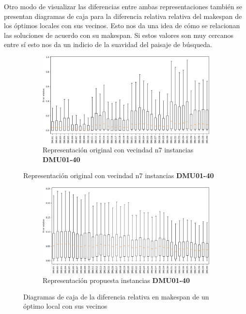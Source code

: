 Otro modo de visualizar las diferencias entre ambas representaciones también se presentan diagramas de caja para la diferencia relativa relativa del makespan de los óptimos locales con sus vecinos. Esto nos da una idea de cómo se relacionan las soluciones de acuerdo con su makespan. Si estos valores son muy cercanos entre sí esto nos da un indicio de la suavidad del paisaje de búsqueda.
\begin{figure}[H]
    \begin{subfigure}{\textwidth}
        \centering
        \includegraphics[scale=.6]{Imagenes/bxpn7_1.png}
        \caption{Representación original con vecindad n7 instancias \textbf{DMU01-40}}
    \end{subfigure}
\end{figure}
\begin{figure}[H]\ContinuedFloat
    \begin{subfigure}{\textwidth}
        \centering
        \includegraphics[scale=.6]{Imagenes/bxppr_1.png}
        \caption{Representación propuesta instancias \textbf{DMU01-40}}
    \end{subfigure}
    \caption{Diagramas de caja de la diferencia relativa en makespan de un óptimo local con sus vecinos}
    \label{fig:bxp1}
\end{figure}

